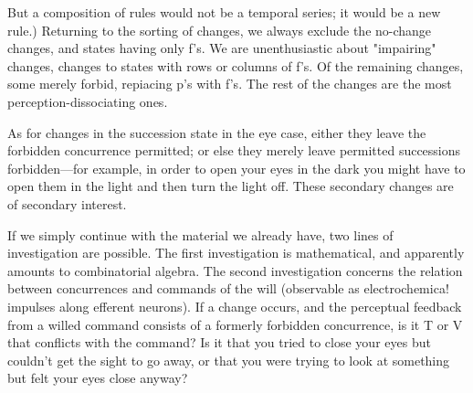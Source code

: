 \documentclass[10pt,twoside]{memoir}
\begin{document}
\begin{enumerate}
{\begin{enumerate}
But a composition of rules would not be a temporal series; it would be a new 
rule.) Returning to the sorting of changes, we always exclude the no-change 
changes, and states having only f's. We are unenthusiastic about "impairing"
changes, changes to states with rows or columns of f's. Of the remaining 
changes, some merely forbid, repiacing p's with f's. The rest of the changes 
are the most perception-dissociating ones. 

As for changes in the succession state in the eye case, either they leave 
the forbidden concurrence permitted; or else they merely leave permitted 
successions forbidden---for example, in order to open your eyes in the dark 
you might have to open them in the light and then turn the light off. These 
secondary changes are of secondary interest. 

If we simply continue with the material we already have, two lines of 
investigation are possible. The first investigation is mathematical, and 
apparently amounts to combinatorial algebra. The second investigation 
concerns the relation between concurrences and commands of the will 
(observable as electrochemica! impulses along efferent neurons). If a change 
occurs, and the perceptual feedback from a willed command consists of a 
formerly forbidden concurrence, is it T or V that conflicts with the 
command? Is it that you tried to close your eyes but couldn't get the sight 
to go away, or that you were trying to look at something but felt your eyes 
close anyway? 


\end{enumerate}}
\end{enumerate}
\end{document}
